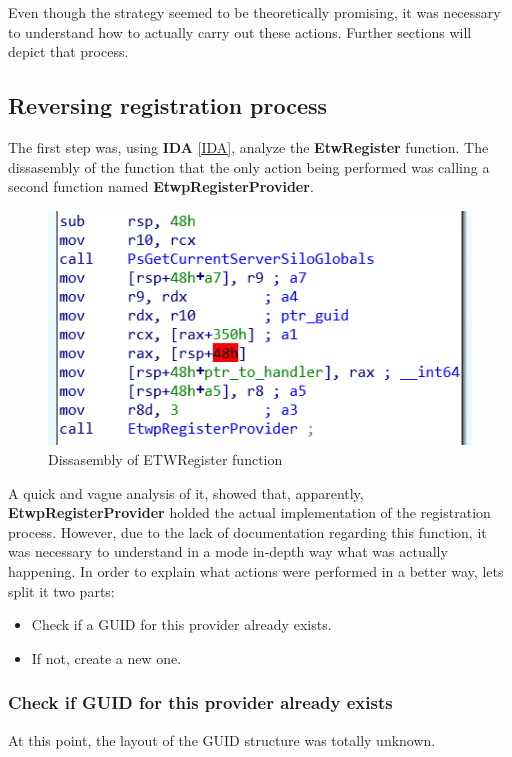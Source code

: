 Even though the strategy seemed to be theoretically promising, it was necessary to understand how to actually carry out these actions. Further sections will depict that process.

\subsection{Reversing registration process}

The first step was, using {\bfseries IDA} \ref{IDA}, analyze the {\bfseries EtwRegister} function. The dissasembly of the function  that the only action being performed was calling a second function named {\bfseries EtwpRegisterProvider}. 

\begin{centering}
\begin{figure}[H]
  \includegraphics[width=12cm]{images/etwRegister_code.png}
  \caption[]{Dissasembly of ETWRegister function}
  \label{fig:etwRegister_code}
\end{figure}
\end{centering}

A quick and vague analysis of it, showed that, apparently, {\bfseries EtwpRegisterProvider} holded the actual implementation of the registration process. However, due to the lack of documentation regarding this function, it was necessary to understand in a mode in-depth way what was actually happening. In order to explain what actions were performed in a better way, lets split it two parts:
\begin{itemize}
  \item Check if a GUID for this provider already exists.
  \item If not, create a new one. 
\end{itemize}

\subsubsection{Check if GUID for this provider already exists}
At this point, the layout of the GUID structure was totally unknown. 

